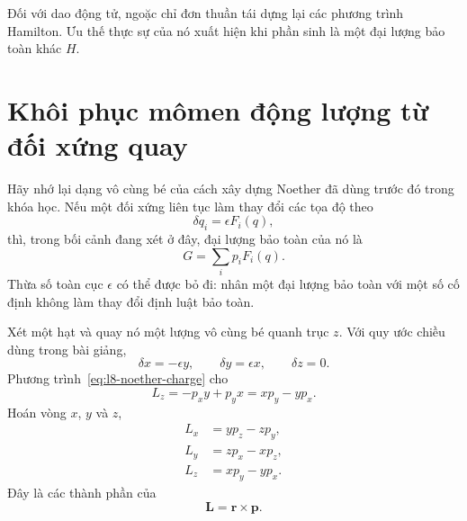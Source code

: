 \begin{classroomqa}
\end{classroomqa}

Đối với dao động tử, ngoặc chỉ đơn thuần tái dựng lại các phương trình Hamilton.
Ưu thế thực sự của nó xuất hiện khi phần sinh là một đại lượng bảo toàn khác
\(H\).

\section{Khôi phục mômen động lượng từ đối xứng quay}

Hãy nhớ lại dạng vô cùng bé của cách xây dựng Noether đã dùng trước đó trong khóa học. Nếu một đối xứng liên tục làm thay đổi các tọa độ theo
\begin{equation}
  \delta q_i=\epsilon F_i(q),
  \label{eq:l8-noether-variation}
\end{equation}
thì, trong bối cảnh đang xét ở đây, đại lượng bảo toàn của nó là
\begin{equation}
  G=\sum_i p_iF_i(q).
  \label{eq:l8-noether-charge}
\end{equation}
Thừa số toàn cục \(\epsilon\) có thể được bỏ đi: nhân một đại lượng bảo toàn
với một số cố định không làm thay đổi định luật bảo toàn.

Xét một hạt và quay nó một lượng vô cùng bé quanh trục \(z\). Với quy ước chiều dùng trong bài giảng,
\begin{equation}
  \delta x=-\epsilon y,\qquad
  \delta y=\epsilon x,\qquad
  \delta z=0.
  \label{eq:l8-z-rotation}
\end{equation}
Phương trình~\eqref{eq:l8-noether-charge} cho
\begin{equation}
  L_z=-p_xy+p_yx=xp_y-yp_x.
  \label{eq:l8-lz}
\end{equation}
Hoán vòng \(x\), \(y\) và \(z\),
\begin{equation}
  \boxed{\begin{aligned}
    L_x&=yp_z-zp_y,\\
    L_y&=zp_x-xp_z,\\
    L_z&=xp_y-yp_x.
  \end{aligned}}
  \label{eq:l8-angular-components}
\end{equation}
Đây là các thành phần của
\begin{equation}
  \boldsymbol L=\boldsymbol r\times\boldsymbol p.
  \label{eq:l8-cross-product}
\end{equation}


